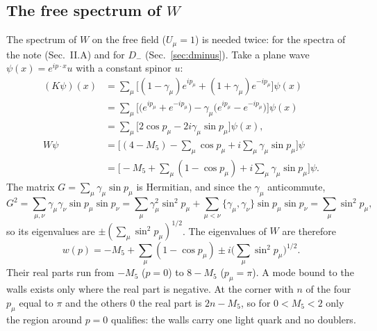 \documentclass[11pt,a4paper]{article}
\numberwithin{equation}{section}
\begin{document}
\subsection{The free spectrum of $W$}
\label{sec:free}
The spectrum of $W$ on the free field ($U_\mu=1$) is needed twice: for the spectra of the note
(Sec.~II.A) and for $D_-$ (Sec.~\ref{sec:dminus}). Take a plane wave $\psi(x)=e^{ip\cdot x}u$ with
a constant spinor $u$:
\begin{align}
(K\psi)(x)&=\sum_\mu\Big[(1-\gamma_\mu)e^{ip_\mu}+(1+\gamma_\mu)e^{-ip_\mu}\Big]\psi(x)\nonumber\\
&=\sum_\mu\Big[\big(e^{ip_\mu}+e^{-ip_\mu}\big)-\gamma_\mu\big(e^{ip_\mu}-e^{-ip_\mu}\big)\Big]\psi(x)\nonumber\\
&=\sum_\mu\Big[2\cos p_\mu-2i\gamma_\mu\sin p_\mu\Big]\psi(x),\nonumber\\
W\psi&=\Big[(4-M_5)-\sum_\mu\cos p_\mu+i\sum_\mu\gamma_\mu\sin p_\mu\Big]\psi\nonumber\\
&=\Big[-M_5+\sum_\mu(1-\cos p_\mu)+i\sum_\mu\gamma_\mu\sin p_\mu\Big]\psi .
\end{align}
The matrix $G=\sum_\mu\gamma_\mu\sin p_\mu$ is Hermitian, and since the $\gamma_\mu$ anticommute,
\begin{equation}
G^2=\sum_{\mu,\nu}\gamma_\mu\gamma_\nu\sin p_\mu\sin p_\nu
=\sum_\mu\gamma_\mu^2\sin^2p_\mu+\sum_{\mu<\nu}\{\gamma_\mu,\gamma_\nu\}\sin p_\mu\sin p_\nu
=\sum_\mu\sin^2p_\mu ,
\end{equation}
so its eigenvalues are $\pm(\sum_\mu\sin^2p_\mu)^{1/2}$. The eigenvalues of $W$ are therefore
\begin{equation}
w(p)=-M_5+\sum_\mu(1-\cos p_\mu)\pm i\Big(\sum_\mu\sin^2p_\mu\Big)^{1/2}.
\label{eq:wfree}
\end{equation}
Their real parts run from $-M_5$ ($p=0$) to $8-M_5$ ($p_\mu=\pi$). A mode bound to the walls
exists only where the real part is negative. At the corner with $n$ of the four $p_\mu$ equal to
$\pi$ and the others $0$ the real part is $2n-M_5$, so for $0<M_5<2$ only the region around $p=0$
qualifies: the walls carry one light quark and no doublers.
\end{document}
